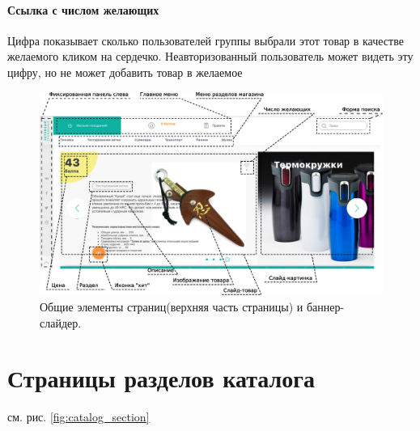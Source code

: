                 \paragraph{Ссылка с числом желающих}
                    Цифра показывает сколько пользователей группы 
                     выбрали этот товар в качестве 
                        желаемого 
                    кликом на сердечко. Неавторизованный пользователь может 
                        видеть
                    эту цифру, но не может добавить товар в желаемое
            
        \begin{figure}
            \includegraphics[width=170mm]{02_noauth_funcs/figures/01r.eps}
            \caption{Общие элементы страниц(верхняя часть страницы) и 
                баннер-слайдер.}
            \label{fig:common_items_1}
        \end{figure}


    \section{Страницы разделов каталога}
        \label{sec:page_catalog_section}
        
        см. рис. \ref{fig:catalog_section}
        
